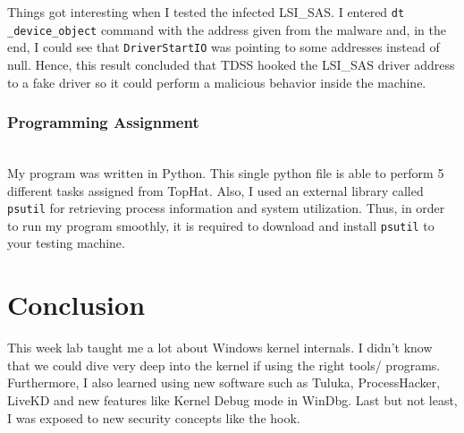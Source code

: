 \documentclass[letterpaper,10pt,titlepage,draftclsnofoot,onecolumn]{IEEEtran}
\begin{document}
Things got interesting when I tested the infected LSI\_SAS. 
I entered \verb|dt _device_object| command with the address given from the malware and, in the end, I could see that \verb|DriverStartIO| was pointing to some addresses instead of null.
Hence, this result concluded that TDSS hooked the LSI\_SAS driver address to a fake driver so it could perform a malicious behavior inside the machine.
\hfill\\
\subsubsection{Programming Assignment}
\hfill\\

My program was written in Python. 
This single python file is able to perform 5 different tasks assigned from TopHat.
Also, I used an external library called \verb|psutil| for retrieving process information and system utilization.
Thus, in order to run my program smoothly, it is required to download and install \verb|psutil| to your testing machine.

\section{Conclusion}
This week lab taught me a lot about Windows kernel internals.
I didn't know that we could dive very deep into the kernel if using the right tools/ programs.
Furthermore, I also learned using new software such as Tuluka, ProcessHacker, LiveKD and new features like Kernel Debug mode in WinDbg. 
Last but not least, I was exposed to new security concepts like the hook.
\end{document}
